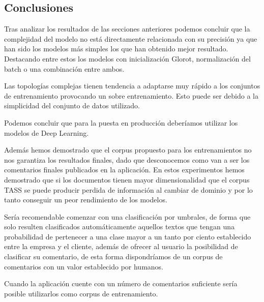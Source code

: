 \subsection{Conclusiones}

Tras analizar los resultados de las secciones anteriores podemos concluir que la complejidad del modelo no está directamente relacionada con su precisión ya que han sido los modelos más simples los que han obtenido mejor resultado. Destacando entre estos los modelos con inicialización Glorot, normalización del batch o una combinación entre ambos.

Las topologías complejas tienen tendencia a adaptarse muy rápido a los conjuntos de entrenamiento provocando un sobre entrenamiento. Esto puede ser debido a la simplicidad del conjunto de datos utilizado.

Podemos concluir que para la puesta en producción deberíamos utilizar los modelos de Deep Learning.

Además hemos demostrado que el corpus propuesto para los entrenamientos no nos garantiza los resultados finales, dado que desconocemos como van a ser los comentarios finales publicados en la aplicación. En estos experimentos hemos demostrado que si los documentos tienen mayor dimensionalidad que el corpus TASS se puede producir perdida de información al cambiar de dominio y por lo tanto conseguir un peor rendimiento de los modelos.

Sería recomendable comenzar con una clasificación por umbrales, de forma que solo resulten clasificados automáticamente aquellos textos que tengan una probabilidad de pertenecer a una clase mayor a un tanto por ciento establecido entre la empresa y el cliente, además de ofrecer al usuario la posibilidad de clasificar su comentario, de esta forma dispondríamos de un corpus de comentarios con un valor establecido por humanos.

Cuando la aplicación cuente con un número de comentarios suficiente sería posible utilizarlos como corpus de entrenamiento.




